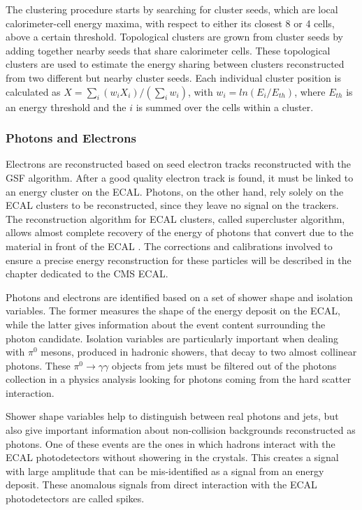The clustering procedure starts by searching for cluster seeds, which are local calorimeter-cell energy maxima, with respect to either its closest 8 or 4 cells, above a certain threshold. 
Topological clusters are grown from cluster seeds by adding together nearby seeds that share calorimeter cells. 
These topological clusters are used to estimate the energy sharing between clusters reconstructed from two different but nearby cluster seeds. 
Each individual cluster position is calculated as $X=\sum_{i}(w_{i}X_{i})/(\sum_{i}w_{i})$, with $w_{i}=ln(E_{i}/E_{th})$, where $E_{th}$ is an energy threshold and the $i$ is summed over the cells within a cluster.

\subsubsection{Photons and Electrons}

Electrons are reconstructed based on seed electron tracks reconstructed with the GSF algorithm. 
After a good quality electron track is found, it must be linked to an energy cluster on the ECAL. 
Photons, on the other hand, rely solely on the ECAL clusters to be reconstructed, since they leave no signal on the trackers. 
The reconstruction algorithm for ECAL clusters, called supercluster algorithm, allows almost complete recovery of the energy of photons that convert due to the material in front of the ECAL \cite{cms_egamma}. 
The corrections and calibrations involved to ensure a precise energy reconstruction for these particles will be described in the chapter dedicated to the CMS ECAL. 

Photons and electrons are identified based on a set of shower shape and isolation variables. 
The former measures the shape of the energy deposit on the ECAL, while the latter gives information about the event content surrounding the photon candidate. 
Isolation variables are particularly important when dealing with $\pi^{0}$ mesons, produced in hadronic showers, that decay to two almost collinear photons. 
These $\pi^{0}\rightarrow\gamma\gamma$ objects from jets must be filtered out of the photons collection in a physics analysis looking for photons coming from the hard scatter interaction. 

Shower shape variables help to distinguish between real photons and jets, but also give important information about non-collision backgrounds reconstructed as photons. 
One of these events are the ones in which hadrons interact with the ECAL photodetectors without showering in the crystals. 
This creates a signal with large amplitude that can be mis-identified as a signal from an energy deposit. 
These anomalous signals from direct interaction with the ECAL photodetectors are called spikes.

